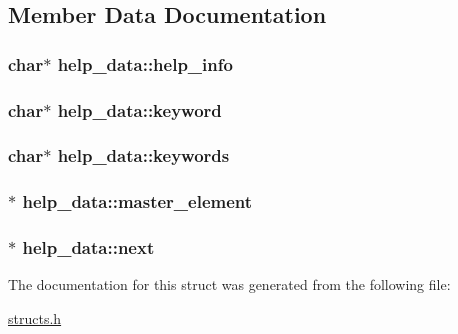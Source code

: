 \subsection{Member Data Documentation}
\hypertarget{structhelp__data_a26cb1630f8e38b9163274fd62941d55d}{
\subsubsection[{help\-\_\-info}]{\setlength{\rightskip}{0pt plus 5cm}char$\ast$ help\-\_\-data\-::help\-\_\-info}}\label{structhelp__data_a26cb1630f8e38b9163274fd62941d55d}
\hypertarget{structhelp__data_add6106e94cd862ac363b11d1d9ecf9dd}{
\subsubsection[{keyword}]{\setlength{\rightskip}{0pt plus 5cm}char$\ast$ help\-\_\-data\-::keyword}}\label{structhelp__data_add6106e94cd862ac363b11d1d9ecf9dd}
\hypertarget{structhelp__data_a17cfce6421d96e59b19a0e9b8bf32913}{
\subsubsection[{keywords}]{\setlength{\rightskip}{0pt plus 5cm}char$\ast$ help\-\_\-data\-::keywords}}\label{structhelp__data_a17cfce6421d96e59b19a0e9b8bf32913}
\hypertarget{structhelp__data_a4b0c86f841a57010ff73222c6967e86f}{
\subsubsection[{master\-\_\-element}]{$\ast$ help\-\_\-data\-::master\-\_\-element}}\label{structhelp__data_a4b0c86f841a57010ff73222c6967e86f}
\hypertarget{structhelp__data_a5e9c4f39cfc8bc5ad3d28f9141c9fc1d}{
\subsubsection[{next}]{$\ast$ help\-\_\-data\-::next}}\label{structhelp__data_a5e9c4f39cfc8bc5ad3d28f9141c9fc1d}


The documentation for this struct was generated from the following file\-:\begin{DoxyCompactItemize}
\item 
\hyperlink{structs_8h}{structs.\-h}\end{DoxyCompactItemize}
